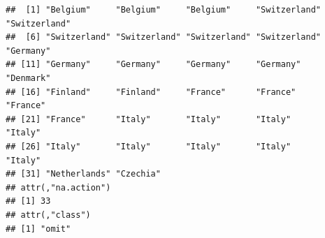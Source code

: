 \documentclass[
]{book}
\newenvironment{Shaded}{\begin{snugshade}}{\end{snugshade}}
\newcommand{\CommentTok}[1]{\textcolor[rgb]{0.56,0.35,0.01}{\textit{#1}}}
\newcommand{\DataTypeTok}[1]{\textcolor[rgb]{0.13,0.29,0.53}{#1}}
\newcommand{\KeywordTok}[1]{\textcolor[rgb]{0.13,0.29,0.53}{\textbf{#1}}}
\newcommand{\NormalTok}[1]{#1}
\newcommand{\OperatorTok}[1]{\textcolor[rgb]{0.81,0.36,0.00}{\textbf{#1}}}
\newcommand{\StringTok}[1]{\textcolor[rgb]{0.31,0.60,0.02}{#1}}
\begin{document}
\begin{Shaded}
\end{Shaded}

\begin{verbatim}
##  [1] "Belgium"     "Belgium"     "Belgium"     "Switzerland" "Switzerland"
##  [6] "Switzerland" "Switzerland" "Switzerland" "Switzerland" "Germany"    
## [11] "Germany"     "Germany"     "Germany"     "Germany"     "Denmark"    
## [16] "Finland"     "Finland"     "France"      "France"      "France"     
## [21] "France"      "Italy"       "Italy"       "Italy"       "Italy"      
## [26] "Italy"       "Italy"       "Italy"       "Italy"       "Italy"      
## [31] "Netherlands" "Czechia"    
## attr(,"na.action")
## [1] 33
## attr(,"class")
## [1] "omit"
\end{verbatim}

\begin{Shaded}
\end{Shaded}
\end{document}
